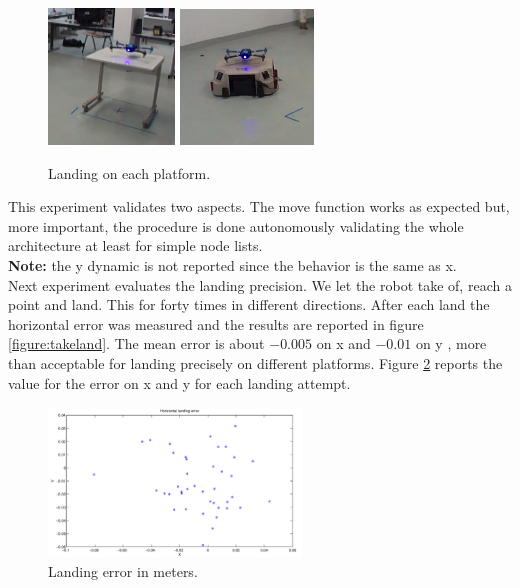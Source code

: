 \begin{figure}[h]
\centering
 \includegraphics[width=0.3\textwidth]{multi1.png}\hspace{0.01\textwidth}
 \includegraphics[width=0.3154\textwidth]{multi2.png}\\[1em]
 \caption{Landing on each platform.}
 \label{figure:mulland}
\end{figure}

This experiment validates two aspects. The move function works as expected but, more important, the procedure is done autonomously validating the whole architecture at least for simple node lists. \\

\noindent
\textbf{Note:} the y dynamic is not reported since the behavior is the same as x. \\

\noindent
Next experiment evaluates the landing precision. We let the robot take of, reach a point and land. This for forty times in different directions. After each land the horizontal error was measured and the results are reported in figure \ref{figure:takeland}. The mean error is about $-0.005$ on x and $-0.01$ on y , more than acceptable for landing precisely on different platforms. Figure \ref{figure:landerr} reports the value for the error on x and y for each landing attempt.

\begin{figure}[h]
\centering
 \includegraphics[width=0.6\textwidth]{landing.png}
 \caption{Landing error in meters.}
 \label{figure:landerr}
\end{figure}


